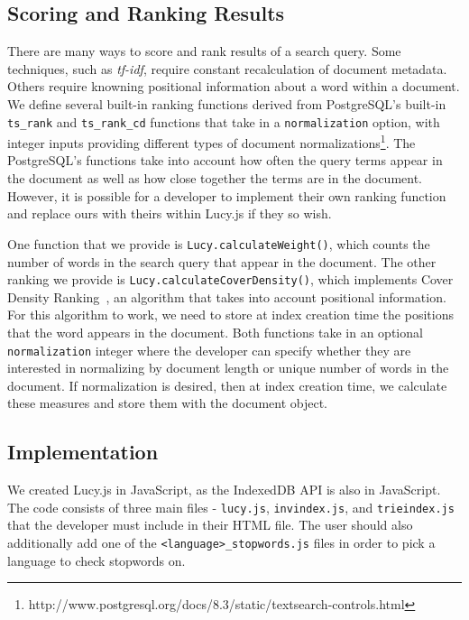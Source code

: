 \documentclass{vldb}
\begin{document}
\subsection{Scoring and Ranking Results}

There are many ways to score and rank results of a search query. Some techniques, such as \textit{tf-idf}, require constant recalculation of document metadata. Others require knowning positional information about a word within a document. We define several built-in ranking functions derived from PostgreSQL's built-in \texttt{ts\_rank} and \texttt{ts\_rank\_cd} functions that take in a \texttt{normalization} option, with integer inputs providing different types of document normalizations\footnote{http://www.postgresql.org/docs/8.3/static/textsearch-controls.html}.
The PostgreSQL's functions take into account how often the query terms appear in the document as well as how close together the terms are in the document. However, it is possible for a developer to implement their own ranking function and replace ours with theirs within Lucy.js if they so wish.

One function that we provide is \texttt{Lucy.calculateWeight()}, which counts the number of words in the search query that appear in the document. The other ranking we provide is \texttt{Lucy.calculateCoverDensity()}, which implements Cover Density Ranking~\cite{li2002improvement}, an algorithm that takes into account positional information. For this algorithm to work, we need to store at index creation time the positions that the word appears in the document. Both functions take in an optional \texttt{normalization} integer where the developer can specify whether they are interested in normalizing by document length or unique number of words in the document. If normalization is desired, then at index creation time, we calculate these measures and store them with the document object.

\subsection{Implementation}

We created Lucy.js in JavaScript, as the IndexedDB API is also in JavaScript. The code consists of three main files - \texttt{lucy.js}, \texttt{invindex.js}, and \texttt{trieindex.js} that the developer must include in their HTML file. The user should also additionally add one of the \texttt{<language>\_stopwords.js} files in order to pick a language to check stopwords on.
\end{document}
